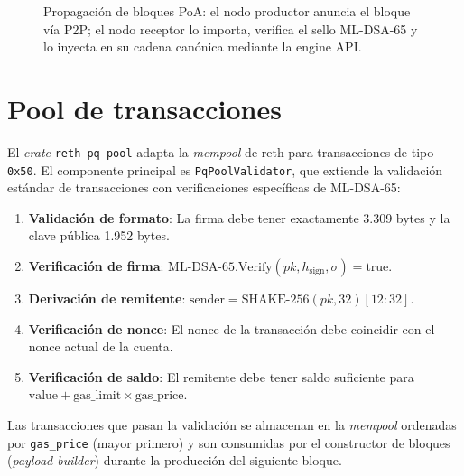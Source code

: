 \begin{figure}[htbp]
\caption{Propagación de bloques PoA: el nodo productor anuncia el bloque vía P2P; el nodo receptor lo importa, verifica el sello ML-DSA-65 y lo inyecta en su cadena canónica mediante la engine API.}
\label{fig:block_propagation}
\end{figure}


\section{Pool de transacciones}
\label{sec:dev_pool}

El \emph{crate} \texttt{reth-pq-pool} adapta la \emph{mempool} de reth para transacciones de tipo \texttt{0x50}. El componente principal es \texttt{PqPoolValidator}, que extiende la validación estándar de transacciones con verificaciones específicas de ML-DSA-65:

\begin{enumerate}
  \item \textbf{Validación de formato}: La firma debe tener exactamente 3.309 bytes y la clave pública 1.952 bytes.
  \item \textbf{Verificación de firma}: $\text{ML-DSA-65.Verify}(\mathit{pk}, h_{\text{sign}}, \sigma) = \text{true}$.
  \item \textbf{Derivación de remitente}: $\text{sender} = \text{SHAKE-256}(\mathit{pk}, 32)[12{:}32]$.
  \item \textbf{Verificación de nonce}: El nonce de la transacción debe coincidir con el nonce actual de la cuenta.
  \item \textbf{Verificación de saldo}: El remitente debe tener saldo suficiente para $\text{value} + \text{gas\_limit} \times \text{gas\_price}$.
\end{enumerate}

Las transacciones que pasan la validación se almacenan en la \emph{mempool} ordenadas por \texttt{gas\_price} (mayor primero) y son consumidas por el constructor de bloques (\emph{payload builder}) durante la producción del siguiente bloque.


